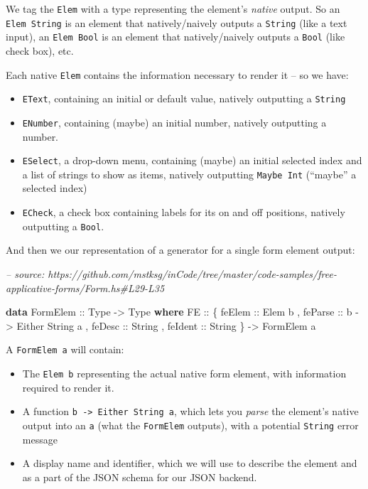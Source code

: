 \documentclass[]{article}
\newenvironment{Shaded}{}{}
\newcommand{\CommentTok}[1]{\textcolor[rgb]{0.38,0.63,0.69}{\textit{#1}}}
\newcommand{\DataTypeTok}[1]{\textcolor[rgb]{0.56,0.13,0.00}{#1}}
\newcommand{\KeywordTok}[1]{\textcolor[rgb]{0.00,0.44,0.13}{\textbf{#1}}}
\newcommand{\NormalTok}[1]{#1}
\newcommand{\OtherTok}[1]{\textcolor[rgb]{0.00,0.44,0.13}{#1}}
\begin{document}
We tag the \texttt{Elem} with a type representing the element's \emph{native}
output. So an \texttt{Elem\ String} is an element that natively/naively outputs
a \texttt{String} (like a text input), an \texttt{Elem\ Bool} is an element that
natively/naively outputs a \texttt{Bool} (like check box), etc.

Each native \texttt{Elem} contains the information necessary to render it -- so
we have:

\begin{itemize}
\tightlist
\item
  \texttt{EText}, containing an initial or default value, natively outputting a
  \texttt{String}
\item
  \texttt{ENumber}, containing (maybe) an initial number, natively outputting a
  number.
\item
  \texttt{ESelect}, a drop-down menu, containing (maybe) an initial selected
  index and a list of strings to show as items, natively outputting
  \texttt{Maybe\ Int} (``maybe'' a selected index)
\item
  \texttt{ECheck}, a check box containing labels for its on and off positions,
  natively outputting a \texttt{Bool}.
\end{itemize}

And then we our representation of a generator for a single form element output:

\begin{Shaded}
\begin{Highlighting}[]
\CommentTok{-- source: https://github.com/mstksg/inCode/tree/master/code-samples/free-applicative-forms/Form.hs#L29-L35}

\KeywordTok{data} \DataTypeTok{FormElem}\OtherTok{ ::} \DataTypeTok{Type} \OtherTok{->} \DataTypeTok{Type} \KeywordTok{where}
    \DataTypeTok{FE}\OtherTok{ ::}\NormalTok{ \{}\OtherTok{ feElem  ::} \DataTypeTok{Elem}\NormalTok{ b}
\NormalTok{          ,}\OtherTok{ feParse ::}\NormalTok{ b }\OtherTok{->} \DataTypeTok{Either} \DataTypeTok{String}\NormalTok{ a}
\NormalTok{          ,}\OtherTok{ feDesc  ::} \DataTypeTok{String}
\NormalTok{          ,}\OtherTok{ feIdent ::} \DataTypeTok{String}
\NormalTok{          \}}
        \OtherTok{->} \DataTypeTok{FormElem}\NormalTok{ a}
\end{Highlighting}
\end{Shaded}

A \texttt{FormElem\ a} will contain:

\begin{itemize}
\tightlist
\item
  The \texttt{Elem\ b} representing the actual native form element, with
  information required to render it.
\item
  A function \texttt{b\ -\textgreater{}\ Either\ String\ a}, which lets you
  \emph{parse} the element's native output into an \texttt{a} (what the
  \texttt{FormElem} outputs), with a potential \texttt{String} error message
\item
  A display name and identifier, which we will use to describe the element and
  as a part of the JSON schema for our JSON backend.
\end{itemize}
\end{document}
